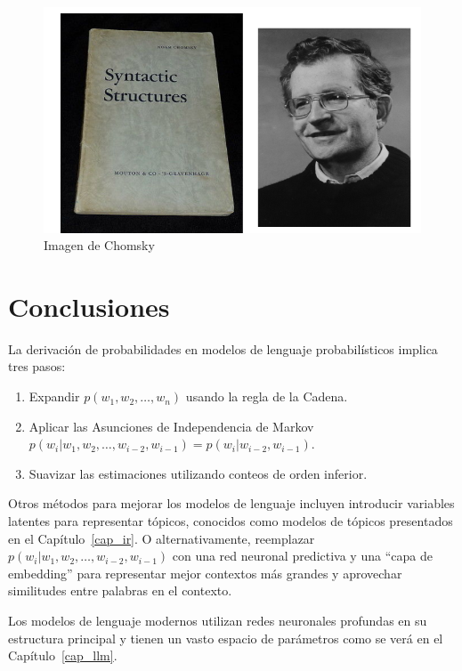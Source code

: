 \begin{figure}[h]
    \centering
    \includegraphics[scale = 0.4]{pics/chomsky.png}
    \caption{Imagen de Chomsky}
\end{figure}


\section{Conclusiones}
La derivación de probabilidades en modelos de lenguaje probabilísticos implica tres pasos:
    \begin{enumerate}
        \item Expandir $p(w_1, w_2, \ldots, w_n)$ usando la regla de la Cadena.
        \item Aplicar las Asunciones de Independencia de Markov \\
        $p(w_i | w_1, w_2, \ldots, w_{i-2}, w_{i-1}) = p(w_i | w_{i-2}, w_{i-1})$.
        \item Suavizar las estimaciones utilizando conteos de orden inferior.
    \end{enumerate}
Otros métodos para mejorar los modelos de lenguaje incluyen introducir variables latentes para representar tópicos, conocidos como modelos de tópicos \cite{blei2003latent} presentados en el Capítulo~\ref{cap_ir}. O alternativamente, reemplazar $p(w_i | w_1, w_2, \ldots, w_{i-2}, w_{i-1})$ con una red neuronal predictiva y una ``capa de embedding'' para representar mejor contextos más grandes y aprovechar similitudes entre palabras en el contexto. \cite{bengio2000neural}

Los modelos de lenguaje modernos utilizan redes neuronales profundas en su estructura principal y tienen un vasto espacio de parámetros como se verá en el Capítulo~\ref{cap_llm}.


